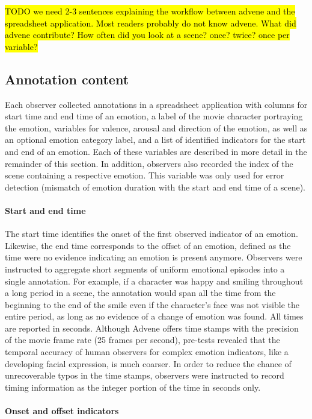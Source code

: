 \hl{TODO we need 2-3 sentences explaining the workflow between advene and the
spreadsheet application. Most readers probably do not know advene. What did
advene contribute? How often did you look at a scene? once? twice? once per
variable?}

\subsection*{Annotation content}

Each observer collected annotations in a spreadsheet application with columns
for start time and end time of an emotion, a label of the movie character
portraying the emotion, variables for valence, arousal and direction of the
emotion, as well as an optional emotion category label, and a list of
identified indicators for the start and end of an emotion. Each of these
variables are described in more detail in the remainder of this section. In
addition, observers also recorded the index of the scene containing a
respective emotion. This variable was only used for error detection (mismatch
of emotion duration with the start and end time of a scene).

\paragraph{Start and end time}

The start time identifies the onset of the first observed indicator of an
emotion. Likewise, the end time corresponds to the offset of an emotion,
defined as the time were no evidence indicating an emotion is present anymore.
Observers were instructed to aggregate short segments of uniform emotional
episodes into a single annotation. For example, if a character was happy and
smiling throughout a long period in a scene, the annotation would span all the
time from the beginning to the end of the smile even if the character's face was
not visible the entire period, as long as no evidence of a change of emotion
was found.  All times are reported in seconds. Although Advene offers time
stamps with the precision of the movie frame rate (25 frames per second),
pre-tests revealed that the temporal accuracy of human observers for complex
emotion indicators, like a developing facial expression, is much coarser. In
order to reduce the chance of unrecoverable typos in the time stamps, observers
were instructed to record timing information as the integer portion of the time
in seconds only.

\paragraph{Onset and offset indicators}

